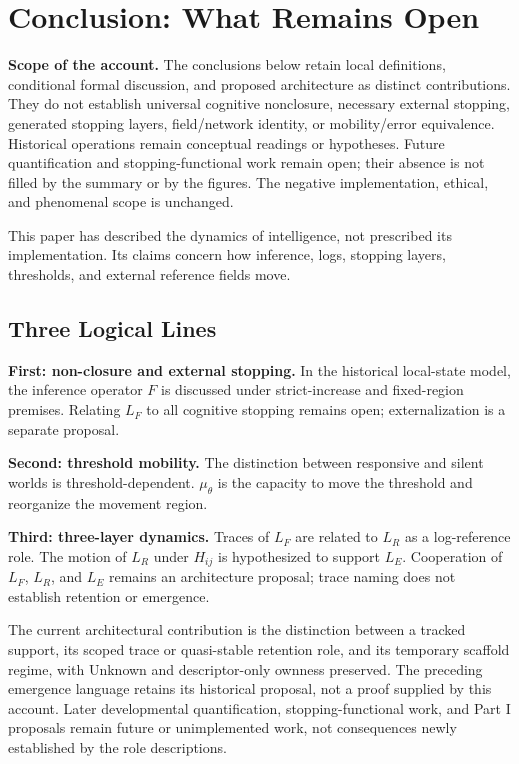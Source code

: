 \section{Conclusion: What Remains Open}

\noindent\textbf{Scope of the account.} The conclusions below retain local definitions, conditional formal discussion, and proposed architecture as distinct contributions. They do not establish universal cognitive nonclosure, necessary external stopping, generated stopping layers, field/network identity, or mobility/error equivalence. Historical operations remain conceptual readings or hypotheses. Future quantification and stopping-functional work remain open; their absence is not filled by the summary or by the figures. The negative implementation, ethical, and phenomenal scope is unchanged.


This paper has described the dynamics of intelligence, not prescribed its implementation. Its claims concern how inference, logs, stopping layers, thresholds, and external reference fields move.

\subsection{Three Logical Lines}

\textbf{First: non-closure and external stopping.} In the historical local-state model, the inference operator $F$ is discussed under strict-increase and fixed-region premises. Relating $L_F$ to all cognitive stopping remains open; externalization is a separate proposal.

\textbf{Second: threshold mobility.} The distinction between responsive and silent worlds is threshold-dependent. $\mu_\theta$ is the capacity to move the threshold and reorganize the movement region.

\textbf{Third: three-layer dynamics.} Traces of $L_F$ are related to $L_R$ as a log-reference role. The motion of $L_R$ under $H_{ij}$ is hypothesized to support $L_E$. Cooperation of $L_F$, $L_R$, and $L_E$ remains an architecture proposal; trace naming does not establish retention or emergence.

The current architectural contribution is the distinction between a tracked support, its scoped trace or quasi-stable retention role, and its temporary scaffold regime, with Unknown and descriptor-only ownness preserved. The preceding emergence language retains its historical proposal, not a proof supplied by this account. Later developmental quantification, stopping-functional work, and Part I proposals remain future or unimplemented work, not consequences newly established by the role descriptions.

